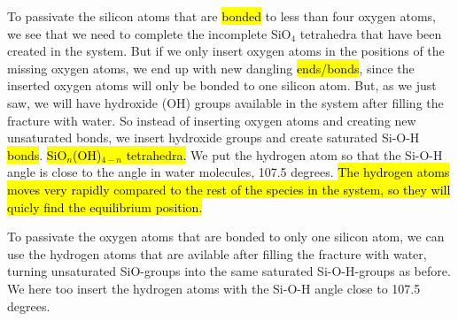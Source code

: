 
To passivate the silicon atoms that are \hl{bonded} to less than four oxygen atoms, we see that we need to complete the incomplete SiO$_4$ tetrahedra that have been created in the system. But if we only insert oxygen atoms in the positions of the missing oxygen atoms, we end up with new dangling \hl{ends/bonds}, since the inserted oxygen atoms will only be bonded to one silicon atom. But, as we just saw, we will have hydroxide (OH) groups available in the system after filling the fracture with water. So instead of inserting oxygen atoms and creating new unsaturated bonds, we insert hydroxide groups and create saturated Si-O-H \hl{bonds}. \hl{ SiO$_n$(OH)$_{4-n}$ tetrahedra.} We put the hydrogen atom so that the Si-O-H angle is close to the angle in water molecules, 107.5 degrees. \hl{The hydrogen atoms moves very rapidly compared to the rest of the species in the system, so they will quicly find the equilibrium position.}

To passivate the oxygen atoms that are bonded to only one silicon atom, we can use the hydrogen atoms that are avilable after filling the fracture with water, turning unsaturated SiO-groups into the same saturated Si-O-H-groups as before. We here too insert the hydrogen atoms with the Si-O-H angle close to 107.5 degrees.

